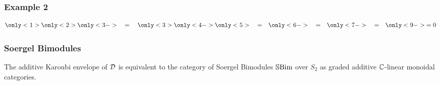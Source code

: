 \begin{frame}
    \frametitle{Example 2}

    \begin{gather*}
        \only<1>{
            
        }
        \only<2>{
            
        }
        \only<3->{
            
            \quad = \quad
            \only<3>{
                
            }
            \only<4->{
                
            }
            \only<5>{
                \quad = \quad
                
            }
            \only<6->{
                \quad = \quad
                
            }
            \only<7->{
                \quad = \quad
                
            }
            \only<9->{
                = 0
            }
        }
    \end{gather*}

\end{frame}


\begin{frame}
    \frametitle{Soergel Bimodules}

    \begin{theorem}
        The additive Karoubi envelope of $\mathcal{D}$ is equivalent to the category of Soergel Bimodules $\operatorname{\mathbb{S}Bim}$ over $S_2$ as graded additive $\mathbb{C}$-linear monoidal categories.
    \end{theorem}
\end{frame}


